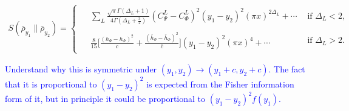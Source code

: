 \documentclass[11pt]{article}
\newcommand{\NL}[1]{\textcolor{blue}{#1}}
\begin{document}
\begin{align}\label{smallxMixture_wrt_mixture}
\boxed{
S(\bar{\rho}_{y_1} \| \bar{\rho}_{y_2} )
=
\begin{cases}
\begin{aligned}
&\sum_L\frac{\sqrt{\pi}\Gamma(\Delta_L+1)}
{4\Gamma(\Delta_L+\frac32)}
(C^L_{\Psi}-C^L_{\Phi})^2
(y_1-y_2)^2(\pi x)^{2\Delta_L}
+\cdots
\end{aligned}
&
\text{if }\Delta_L < 2,
\\[2ex]
\begin{aligned}
&\frac{8}{15}
\Bigg[
\frac{(h_\Psi-h_\Phi)^2}{c} 
+\frac{(\bar h_\Psi-\bar h_\Phi)^2}{\bar c}
\Bigg]
(y_1-y_2)^2(\pi x)^4
+\cdots
\end{aligned}
&
\text{if }\Delta_L>2 .
\end{cases}
}
\end{align}

\NL{Understand why this is symmetric under $(y_1,y_2)\to (y_1+c,y_2+c)$. The fact that it is proportional to $(y_1-y_2)^2$ is expected from the Fisher information form of it, but in principle it could be proportional to $(y_1-y_2)^2 f(y_1)$.}


\end{document}
